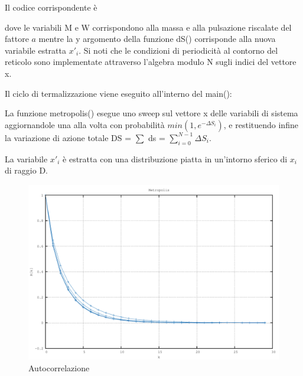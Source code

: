 \documentclass[a4paper,11pt]{report}
\begin{document}
Il codice corrispondente è

dove le variabili {\ttfamily M} e {\ttfamily W} corrispondono alla massa e alla pulsazione riscalate del fattore $a$ mentre la {\ttfamily y} argomento della funzione {\ttfamily dS()} corrisponde alla nuova variabile estratta $x'_{i}$. Si noti che le condizioni di periodicità al contorno del reticolo sono implementate attraverso l'algebra modulo N sugli indici del vettore {\ttfamily x}.

Il ciclo di termalizzazione viene eseguito all'interno del {\ttfamily main()}:

La funzione {\ttfamily metropolis()} esegue uno sweep sul vettore {\ttfamily x} delle variabili di sistema aggiornandole una alla volta con probabilità $min(1,e^{-\Delta S_i})$, e restituendo infine la variazione di azione totale {\ttfamily DS} = {\ttfamily $\sum$ ds} = $\sum^{N-1}_{i=0}\Delta S_i$.

La variabile $x'_i$ è estratta con una distribuzione piatta in un'intorno sferico di $x_i$ di raggio {\ttfamily D}.

\begin{figure}[h]
\centering
\includegraphics[width=\textwidth]{autocorrelation}
\caption{Autocorrelazione}
\label{fig:autocorrelation}
\end{figure}
\end{document}
